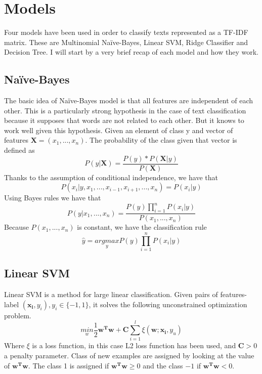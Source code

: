 \section{Models}
Four models have been used in order to classify texts represented as a TF-IDF matrix. These are Multinomial Na\"{i}ve-Bayes, Linear SVM, Ridge Classifier and Decision Tree. I will start by a very brief recap of each model and how they work. 
\subsection{Na\"{i}ve-Bayes\cite{zhang_optimality_nodate}}
The basic idea of Na\"{i}ve-Bayes model is that all features are independent of each other. This is a particularly strong hypothesis in the case of text classification because it supposes that words are not related to each other. But it knows to work well given this hypothesis. 
Given an element of class y and vector of features $\mathbf{X} = (x_1,...,x_n)$. The probability of the class given that vector is defined as 
\begin{equation}
 P(y | \mathbf{X}) = \frac{P(y)*P(\mathbf{X} | y)}{P(\mathbf{X})}
\end{equation}
Thanks to the assumption of conditional independence, we have that 
\begin{equation}
 P(x_i |y,x_1, ...,x_{i-1},x_{i+1},...,x_n) = P(x_i | y)
\end{equation}
Using Bayes rules we have that
\begin{equation}
 P(y|x_1,...,x_n) = \frac{P(y)\prod_{i=1}^n P(x_i | y)}{P(x_1,...,x_n)}
\end{equation}
Because $P(x_1,...,x_n)$ is constant, we have the classification rule 
\begin{equation}
 \hat{y} = \underset{y}{argmax} P(y)\prod_{i=1}^n P(x_i | y)
\end{equation}
\subsection{Linear SVM}
Linear SVM is a method for large linear classification. Given pairs of features-label $(\mathbf{x_i}, y_i), y_i \in \{-1, 1\}$, it solves the following unconstrained optimization problem. 
\begin{equation}
 \underset{w}{min} \frac{1}{2} \mathbf{w^Tw} + \mathbf{C} \sum_{i=1}^l \xi(\mathbf{w;x_i},y_u)
\end{equation}
Where $\xi$ is a loss function, in this case L2 loss function has been used, and $\mathbf{C} > 0$ a penalty parameter. 
Class of new examples are assigned by looking at the value of $\mathbf{w^Tw}$. The class 1 is assigned if $\mathbf{w^Tw} \geq 0$ and the class $-1$ if $\mathbf{w^Tw} < 0$.
